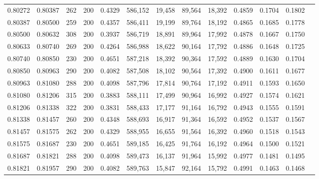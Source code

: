 \begin{tabular}{rrrrrrrrrrrrr}
0.80272 & 0.80387 &    262 & 200 &                                     0.4329 & 586,152 &  19,458 &  89,564 &  18,392 & 0.4859 & 0.1704 & 0.1802 \\
0.80387 & 0.80500 &    259 & 200 &                                     0.4357 & 586,411 &  19,199 &  89,764 &  18,192 & 0.4865 & 0.1685 & 0.1778 \\
0.80500 & 0.80632 &    308 & 200 &                                     0.3937 & 586,719 &  18,891 &  89,964 &  17,992 & 0.4878 & 0.1667 & 0.1750 \\
0.80633 & 0.80740 &    269 & 200 &                                     0.4264 & 586,988 &  18,622 &  90,164 &  17,792 & 0.4886 & 0.1648 & 0.1725 \\
0.80740 & 0.80850 &    230 & 200 &                                     0.4651 & 587,218 &  18,392 &  90,364 &  17,592 & 0.4889 & 0.1630 & 0.1704 \\
0.80850 & 0.80963 &    290 & 200 &                                     0.4082 & 587,508 &  18,102 &  90,564 &  17,392 & 0.4900 & 0.1611 & 0.1677 \\
0.80963 & 0.81080 &    288 & 200 &                                     0.4098 & 587,796 &  17,814 &  90,764 &  17,192 & 0.4911 & 0.1593 & 0.1650 \\
0.81080 & 0.81206 &    315 & 200 &                                     0.3883 & 588,111 &  17,499 &  90,964 &  16,992 & 0.4927 & 0.1574 & 0.1621 \\
0.81206 & 0.81338 &    322 & 200 &                                     0.3831 & 588,433 &  17,177 &  91,164 &  16,792 & 0.4943 & 0.1555 & 0.1591 \\
0.81338 & 0.81457 &    260 & 200 &                                     0.4348 & 588,693 &  16,917 &  91,364 &  16,592 & 0.4952 & 0.1537 & 0.1567 \\
0.81457 & 0.81575 &    262 & 200 &                                     0.4329 & 588,955 &  16,655 &  91,564 &  16,392 & 0.4960 & 0.1518 & 0.1543 \\
0.81575 & 0.81687 &    230 & 200 &                                     0.4651 & 589,185 &  16,425 &  91,764 &  16,192 & 0.4964 & 0.1500 & 0.1521 \\
0.81687 & 0.81821 &    288 & 200 &                                     0.4098 & 589,473 &  16,137 &  91,964 &  15,992 & 0.4977 & 0.1481 & 0.1495 \\
0.81821 & 0.81957 &    290 & 200 &                                     0.4082 & 589,763 &  15,847 &  92,164 &  15,792 & 0.4991 & 0.1463 & 0.1468 \\

\end{tabular}
